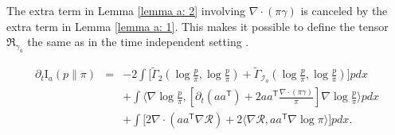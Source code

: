 \documentclass[11pt,reqno]{amsart}
\newcommand{\la}{\langle}
\newcommand{\ra}{\rangle}
\newcommand{\ts}{\mathsf{T}}
\newcommand{\bea}{\begin{eqnarray}}
\newcommand{\eea}{\end{eqnarray}}
\def\pa{\partial}
\begin{document}
\begin{remark}
    The extra term in Lemma \ref{lemma a: 2} involving $\nabla\cdot(\pi\gamma)$ is canceled by the extra term in Lemma \ref{lemma a: 1}. This makes it possible to define the tensor $\mathfrak R_{\gamma_a}$ the same as in the time independent setting \cite{FengLi2021}.
\end{remark}
\begin{lemma}\label{lemma a: 1}
	\bea
\pa_t\mathrm I_{a}({p} \|\pi) &=& -2\int\big[\widetilde \Gamma_2(\log\frac{{p} }{\pi},\log\frac{{p} }{\pi})+\widetilde \Gamma_{\mathcal I_a}(\log\frac{{p} }{\pi},\log\frac{{p} }{\pi}) \big]{p}  dx\\
&&+\int \la \nabla\log\frac{{p} }{\pi},[\pa_t(aa^{\ts})+2aa^{\ts}\frac{\nabla\cdot(\pi\gamma)}{\pi}]\nabla\log\frac{{p} }{\pi}\ra {p}  dx\nonumber \\
	&& +\int\big[
	2\nabla\cdot(aa^{\ts}\nabla\mathcal{R})+2\la \nabla \mathcal R, aa^{\ts}\nabla\log\pi\ra \big]{p}  dx.\nonumber
	\eea
\end{lemma}
\end{document}
